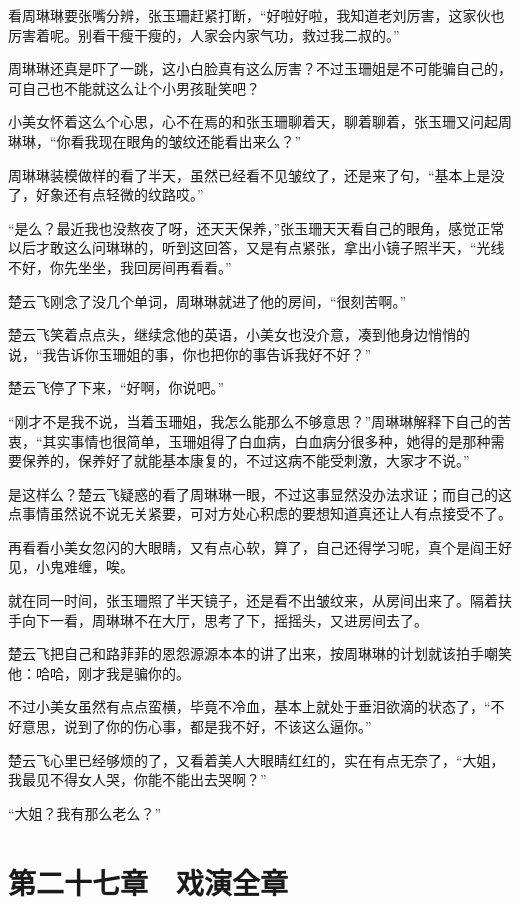 看周琳琳要张嘴分辨，张玉珊赶紧打断，“好啦好啦，我知道老刘厉害，这家伙也厉害着呢。别看干瘦干瘦的，人家会内家气功，救过我二叔的。”

周琳琳还真是吓了一跳，这小白脸真有这么厉害？不过玉珊姐是不可能骗自己的，可自己也不能就这么让个小男孩耻笑吧？

小美女怀着这么个心思，心不在焉的和张玉珊聊着天，聊着聊着，张玉珊又问起周琳琳，“你看我现在眼角的皱纹还能看出来么？”

周琳琳装模做样的看了半天，虽然已经看不见皱纹了，还是来了句，“基本上是没了，好象还有点轻微的纹路哎。”

“是么？最近我也没熬夜了呀，还天天保养，”张玉珊天天看自己的眼角，感觉正常以后才敢这么问琳琳的，听到这回答，又是有点紧张，拿出小镜子照半天，“光线不好，你先坐坐，我回房间再看看。”

楚云飞刚念了没几个单词，周琳琳就进了他的房间，“很刻苦啊。”

楚云飞笑着点点头，继续念他的英语，小美女也没介意，凑到他身边悄悄的说，“我告诉你玉珊姐的事，你也把你的事告诉我好不好？”

楚云飞停了下来，“好啊，你说吧。”

“刚才不是我不说，当着玉珊姐，我怎么能那么不够意思？”周琳琳解释下自己的苦衷，“其实事情也很简单，玉珊姐得了白血病，白血病分很多种，她得的是那种需要保养的，保养好了就能基本康复的，不过这病不能受刺激，大家才不说。”

是这样么？楚云飞疑惑的看了周琳琳一眼，不过这事显然没办法求证；而自己的这点事情虽然说不说无关紧要，可对方处心积虑的要想知道真还让人有点接受不了。

再看看小美女忽闪的大眼睛，又有点心软，算了，自己还得学习呢，真个是阎王好见，小鬼难缠，唉。

就在同一时间，张玉珊照了半天镜子，还是看不出皱纹来，从房间出来了。隔着扶手向下一看，周琳琳不在大厅，思考了下，摇摇头，又进房间去了。

楚云飞把自己和路菲菲的恩怨源源本本的讲了出来，按周琳琳的计划就该拍手嘲笑他：哈哈，刚才我是骗你的。

不过小美女虽然有点点蛮横，毕竟不冷血，基本上就处于垂泪欲滴的状态了，“不好意思，说到了你的伤心事，都是我不好，不该这么逼你。”

楚云飞心里已经够烦的了，又看着美人大眼睛红红的，实在有点无奈了，“大姐，我最见不得女人哭，你能不能出去哭啊？”

“大姐？我有那么老么？”

\section{第二十七章　戏演全章}

